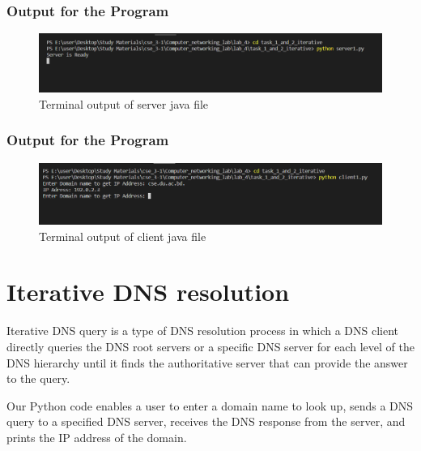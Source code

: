 \documentclass[11pt]{article}
\begin{document}
\subsubsection{Output for the Program}

  \begin{figure}[!h]
\centering
\includegraphics[width=\textwidth]{server1.png}
\caption{Terminal output of server java file }
\end{figure}
\FloatBarrier

\subsubsection{Output for the Program}

  \begin{figure}[!h]
\centering
\includegraphics[width=\textwidth]{client1.png}
\caption{Terminal output of client java file }
\end{figure}
\FloatBarrier



\section{Iterative DNS resolution}
Iterative DNS query is a type of DNS resolution process in which a DNS client directly queries the DNS root servers or a specific DNS server for each level of the DNS hierarchy until it finds the authoritative server that can provide the answer to the query.

Our Python code enables a user to enter a domain name to look up, sends a DNS query to a specified DNS server, receives the DNS response from the server, and prints the IP address of the domain.
\end{document}
